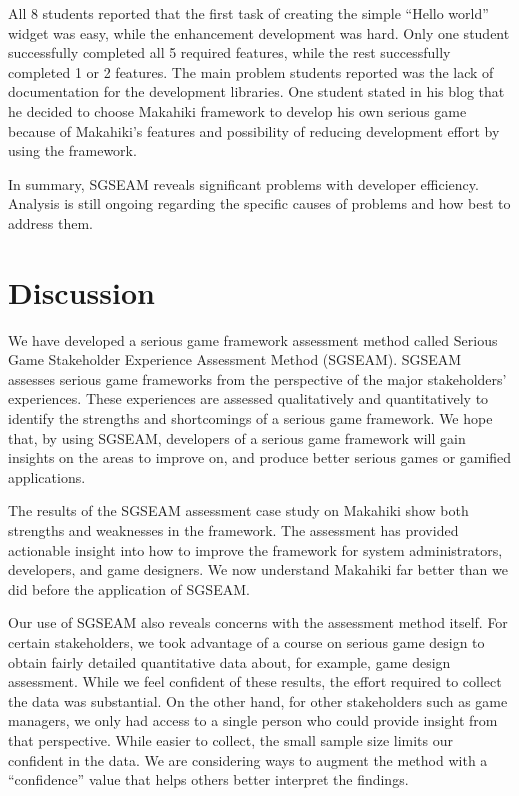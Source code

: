 \documentclass{sigchi}
\begin{document}
All 8 students reported that the first task of creating the simple ``Hello world'' widget
was easy, while the enhancement development was hard. Only one student successfully
completed all 5 required features, while the rest successfully completed 1 or 2
features. The main problem students reported was the lack of documentation for the
development libraries. One student stated in his blog that he decided to choose Makahiki
framework to develop his own serious game because of Makahiki's features and possibility
of reducing development effort by using the framework.

In summary, SGSEAM reveals significant problems with developer efficiency.
Analysis is still ongoing regarding the specific causes of problems and how best to
address them.

\section{Discussion}

We have developed a serious game framework assessment method called Serious Game
Stakeholder Experience Assessment Method (SGSEAM). SGSEAM assesses serious game
frameworks from the perspective of the major stakeholders' experiences. These experiences 
are assessed qualitatively and quantitatively to identify the strengths and
 shortcomings of a serious game framework. We hope that, by using SGSEAM, developers of a serious 
 game framework will gain insights on the areas to improve on, and produce better serious games or gamified applications.

The results of the SGSEAM assessment case study on Makahiki show 
both strengths and
weaknesses in the framework. The assessment has provided actionable
insight into how to improve the framework for system administrators, developers, and game
designers. We now understand Makahiki far better than we did before the application of
SGSEAM.

Our use of SGSEAM also reveals concerns with the assessment method itself.  For certain
stakeholders, we took advantage of a course on serious game design to obtain fairly
detailed quantitative data about, for example, game design assessment.  While we feel
confident of these results, the effort required to collect the data was substantial.  On
the other hand, for other stakeholders such as game managers, we only had access to a
single person who could provide insight from that perspective.  While easier to collect,
the small sample size limits our confident in the data.  We are considering ways to
augment the method with a ``confidence'' value that helps others better interpret the
findings.  
\end{document}
